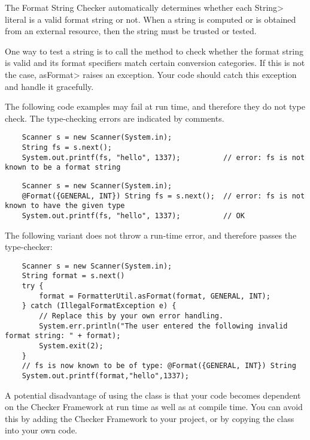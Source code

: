 
The Format String Checker automatically determines whether each \<String>
literal is a valid format string or not.  When a string is computed or is
obtained from an external resource, then the string must be trusted or tested.

One way to test a string is to call the
method to check whether the format string is valid and its format
specifiers match certain conversion categories.
If this is not the case, \<asFormat> raises an exception.  Your code should
catch this exception and handle it gracefully.

The following code examples may fail at run time, and therefore they do not
type check.  The type-checking errors are indicated by comments.

\begin{Verbatim}
    Scanner s = new Scanner(System.in);    
    String fs = s.next();
    System.out.printf(fs, "hello", 1337);          // error: fs is not known to be a format string
\end{Verbatim}

\begin{Verbatim}
    Scanner s = new Scanner(System.in);    
    @Format({GENERAL, INT}) String fs = s.next();  // error: fs is not known to have the given type
    System.out.printf(fs, "hello", 1337);          // OK
\end{Verbatim}

\noindent The following variant does not throw a run-time error, and
therefore passes the type-checker:

\begin{Verbatim}
    Scanner s = new Scanner(System.in);
    String format = s.next()
    try {
        format = FormatterUtil.asFormat(format, GENERAL, INT); 
    } catch (IllegalFormatException e) {
        // Replace this by your own error handling.
        System.err.println("The user entered the following invalid format string: " + format);
        System.exit(2);
    }
    // fs is now known to be of type: @Format({GENERAL, INT}) String
    System.out.printf(format,"hello",1337); 
\end{Verbatim}

\noindent A potential disadvantage of using the  class is that your code becomes
dependent on the Checker Framework at run time as well as at compile time. You
can avoid this by adding the Checker Framework to your project, or by copying
the  class into your own code.

